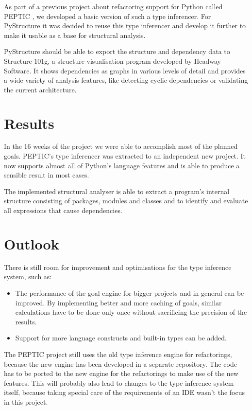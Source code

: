 \documentclass[12pt,halfparskip,DIV11,BCOR10mm]{scrreprt}
\begin{document}
As part of a previous project about refactoring support for Python called PEPTIC \cite{peptic2}, we developed a basic version of such a type inferencer. For PyStructure it was decided to reuse this type inferencer and develop it further to make it usable as a base for structural analysis.

PyStructure should be able to export the structure and dependency data to Structure 101g, a structure visualisation program developed by Headway Software. It shows dependencies as graphs in various levels of detail and provides a wide variety of analysis features, like detecting cyclic dependencies or validating the current architecture.

\section*{Results}

In the 16 weeks of the project we were able to accomplish most of the planned goals. PEPTIC's type inferencer was extracted to an independent new project. It now supports almost all of Python's language features and is able to produce a sensible result in most cases.

The implemented structural analyser is able to extract a program's internal structure consisting of packages, modules and classes and to identify and evaluate all expressions that cause dependencies.

\section*{Outlook}

There is still room for improvement and optimisations for the type inference system, such as:

\begin{itemize}
    \item The performance of the goal engine for bigger projects and in general can be improved. By implementing better and more caching of goals, similar calculations have to be done only once without sacrificing the precision of the results.
    \item Support for more language constructs and built-in types can be added.
\end{itemize}

The PEPTIC project still uses the old type inference engine for refactorings, because the new engine has been developed in a separate repository. The code has to be ported to the new engine for the refactorings to make use of the new features. This will probably also lead to changes to the type inference system itself, because taking special care of the requirements of an IDE wasn't the focus in this project.
\newpage
\end{document}
